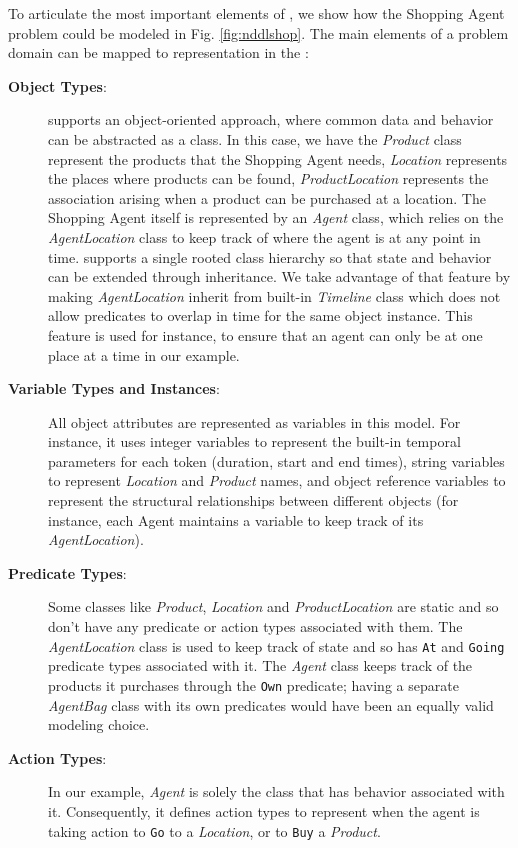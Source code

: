To articulate the most important elements of \nde, we show how the
Shopping Agent problem could be modeled in
Fig. \ref{fig:nddlshop}. The main elements of a problem domain can be
mapped to \eus representation in the :

\begin{description}

\item[\textbf{Object Types}:] \nd supports an object-oriented
  approach, where common data and behavior can be abstracted as a
  class. In this case, we have the \textit{Product} class represent
  the products that the Shopping Agent needs, \textit{Location}
  represents the places where products can be found,
  \textit{ProductLocation} represents the association arising when a
  product can be purchased at a location. The Shopping Agent itself is
  represented by an \textit{Agent} class, which relies on the
  \textit{AgentLocation} class to keep track of where the agent is at
  any point in time. \nd supports a single rooted class hierarchy so
  that state and behavior can be extended through inheritance. We take
  advantage of that feature by making \textit{AgentLocation} inherit
  from \eus built-in \textit{Timeline} class which does not allow
  predicates to overlap in time for the same object instance. This
  feature is used for instance, to ensure that an agent can only be at
  one place at a time in our example.

\item[\textbf{Variable Types and Instances}:] All object attributes
  are represented as variables in this model. For instance, it uses
  integer variables to represent the built-in temporal parameters for
  each token (duration, start and end times), string
  variables to represent \textit{Location} and \textit{Product} names,
  and object reference variables to represent the structural
  relationships between different objects (for instance, each Agent
  maintains a variable to keep track of its \textit{AgentLocation}).

\item[\textbf{Predicate Types}:] Some classes like \textit{Product},
  \textit{Location} and \textit{ProductLocation} are static and so
  don't have any predicate or action types associated with them. The
  \textit{AgentLocation} class is used to keep track of state and so
  has \texttt{At} and \texttt{Going} predicate types associated with
  it. The \textit{Agent} class keeps track of the products it
  purchases through the \texttt{Own} predicate; having a separate
  \textit{AgentBag} class with its own predicates would have been an
  equally valid modeling choice.

\item[\textbf{Action Types}:] In our example, \textit{Agent} is solely
  the class that has behavior associated with it. Consequently, it
  defines action types to represent when the agent is taking action to
  \texttt{Go} to a \textit{Location}, or to \texttt{Buy} a
  \textit{Product}. 
  
\end{description}

